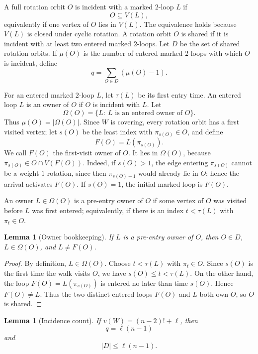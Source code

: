 \documentclass[11pt]{article}
\newtheorem{lemma}[theorem]{Lemma}
\begin{document}
A full rotation orbit \(O\) is incident with a marked \(2\)-loop \(L\) if
\[
  O\subseteq V(L),
\]
equivalently if one vertex of \(O\) lies in \(V(L)\).  The equivalence holds because \(V(L)\) is
closed under cyclic rotation.  A rotation orbit \(O\) is shared if it is incident with at least two
entered marked \(2\)-loops.  Let \(D\) be the set of shared rotation orbits.  If \(\mu(O)\) is the
number of entered marked \(2\)-loops with which \(O\) is incident, define
\[
  q=\sum_{O\in D}(\mu(O)-1).
\]

For an entered marked \(2\)-loop \(L\), let \(\tau(L)\) be its first entry time.  An entered loop
\(L\) is an owner of \(O\) if \(O\) is incident with \(L\).  Let
\[
  \Omega(O)=\{L:\ L\text{ is an entered owner of }O\}.
\]
Thus \(\mu(O)=|\Omega(O)|\).  Since \(W\) is covering, every rotation orbit has a first visited
vertex; let \(s(O)\) be the least index with \(\pi_{s(O)}\in O\), and define
\[
  F(O)=L(\pi_{s(O)}).
\]
We call \(F(O)\) the first-visit owner of \(O\).  It lies in \(\Omega(O)\), because
\(\pi_{s(O)}\in O\cap V(F(O))\).  Indeed, if \(s(O)>1\), the edge entering \(\pi_{s(O)}\) cannot
be a weight-\(1\) rotation, since then \(\pi_{s(O)-1}\) would already lie in \(O\); hence the
arrival activates \(F(O)\).  If \(s(O)=1\), the initial marked loop is \(F(O)\).

An owner \(L\in\Omega(O)\) is a pre-entry owner of \(O\) if some vertex of \(O\) was visited before
\(L\) was first entered; equivalently, if there is an index \(t<\tau(L)\) with \(\pi_t\in O\).

\begin{lemma}[Owner bookkeeping]\label{lem:ownerbook}
If \(L\) is a pre-entry owner of \(O\), then \(O\in D\), \(L\in\Omega(O)\), and
\(L\ne F(O)\).
\end{lemma}

\begin{proof}
By definition, \(L\in\Omega(O)\).  Choose \(t<\tau(L)\) with \(\pi_t\in O\).  Since \(s(O)\) is the
first time the walk visits \(O\), we have \(s(O)\le t<\tau(L)\).  On the other hand, the loop
\(F(O)=L(\pi_{s(O)})\) is entered no later than time \(s(O)\).  Hence \(F(O)\ne L\).  Thus the two
distinct entered loops \(F(O)\) and \(L\) both own \(O\), so \(O\) is shared.
\end{proof}

\begin{lemma}[Incidence count]\label{lem:incidence}
If \(v(W)=(n-2)!+\ell\), then
\[
  q=\ell(n-1) \tag{6a}
\]
and
\[
  |D|\le \ell(n-1). \tag{6b}
\]
\end{lemma}
\end{document}
